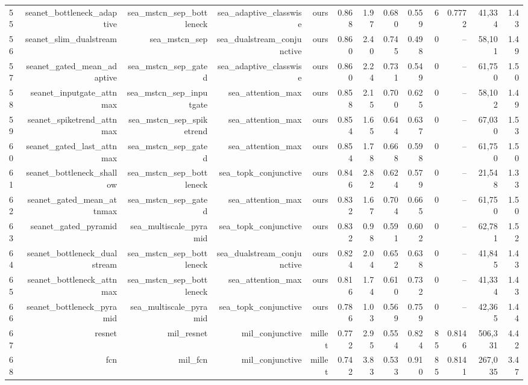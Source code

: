 \begin{table}[t]
\begin{tabular}{lrrrrrrrrrrrr}
55 & seanet\_bottleneck\_adaptive & sea\_mstcn\_sep\_bottleneck & sea\_adaptive\_classwise & ours & 0.868 & 1.97 & 0.680 & 0.559 & 6 & 0.7772 & 41,334 & 1.43 \\
56 & seanet\_slim\_dualstream & sea\_mstcn\_sep & sea\_dualstream\_conjunctive & ours & 0.860 & 2.40 & 0.745 & 0.498 & 0 & -- & 58,101 & 1.49 \\
57 & seanet\_gated\_mean\_adaptive & sea\_mstcn\_sep\_gated & sea\_adaptive\_classwise & ours & 0.860 & 2.24 & 0.731 & 0.549 & 0 & -- & 61,750 & 1.50 \\
58 & seanet\_inputgate\_attnmax & sea\_mstcn\_sep\_inputgate & sea\_attention\_max & ours & 0.858 & 2.15 & 0.700 & 0.625 & 0 & -- & 58,102 & 1.49 \\
59 & seanet\_spiketrend\_attnmax & sea\_mstcn\_sep\_spiketrend & sea\_attention\_max & ours & 0.854 & 1.65 & 0.644 & 0.637 & 0 & -- & 67,030 & 1.53 \\
60 & seanet\_gated\_last\_attnmax & sea\_mstcn\_sep\_gated & sea\_attention\_max & ours & 0.854 & 1.78 & 0.668 & 0.598 & 0 & -- & 61,750 & 1.50 \\
61 & seanet\_bottleneck\_shallow & sea\_mstcn\_sep\_bottleneck & sea\_topk\_conjunctive & ours & 0.846 & 2.82 & 0.624 & 0.579 & 0 & -- & 21,548 & 1.33 \\
62 & seanet\_gated\_mean\_attnmax & sea\_mstcn\_sep\_gated & sea\_attention\_max & ours & 0.832 & 1.67 & 0.704 & 0.665 & 0 & -- & 61,750 & 1.50 \\
63 & seanet\_gated\_pyramid & sea\_multiscale\_pyramid & sea\_topk\_conjunctive & ours & 0.832 & 0.98 & 0.591 & 0.602 & 0 & -- & 62,781 & 1.52 \\
64 & seanet\_bottleneck\_dualstream & sea\_mstcn\_sep\_bottleneck & sea\_dualstream\_conjunctive & ours & 0.824 & 2.04 & 0.652 & 0.638 & 0 & -- & 41,845 & 1.43 \\
65 & seanet\_bottleneck\_attnmax & sea\_mstcn\_sep\_bottleneck & sea\_attention\_max & ours & 0.816 & 1.74 & 0.610 & 0.732 & 0 & -- & 41,334 & 1.43 \\
66 & seanet\_bottleneck\_pyramid & sea\_multiscale\_pyramid & sea\_topk\_conjunctive & ours & 0.786 & 1.03 & 0.569 & 0.759 & 0 & -- & 42,365 & 1.44 \\
67 & resnet & mil\_resnet & mil\_conjunctive & millet & 0.772 & 2.95 & 0.554 & 0.824 & 85 & 0.8146 & 506,331 & 4.42 \\
68 & fcn & mil\_fcn & mil\_conjunctive & millet & 0.742 & 3.83 & 0.533 & 0.910 & 85 & 0.8141 & 267,035 & 3.47 \\

\end{tabular}
\end{table}
